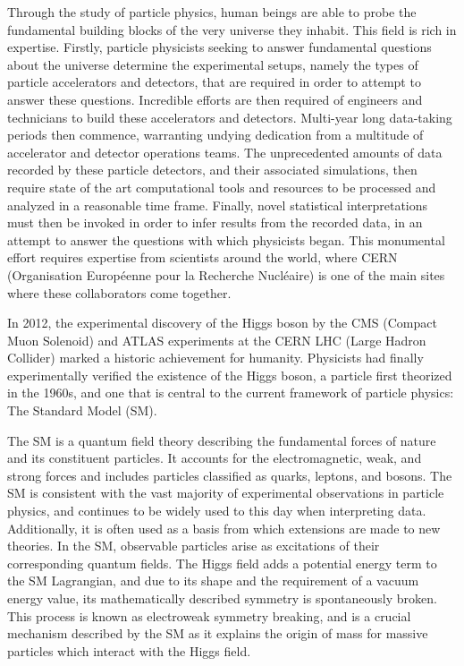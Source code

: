 Through the study of particle physics, human beings are able to probe the fundamental building blocks of the very universe they inhabit. This field is rich in expertise. Firstly, particle physicists seeking to answer fundamental questions about the universe determine the experimental setups, namely the types of particle accelerators and detectors, that are required in order to attempt to answer these questions. Incredible efforts are then required of engineers and technicians to build these accelerators and detectors. Multi-year long data-taking periods then commence, warranting undying dedication from a multitude of accelerator and detector operations teams. The unprecedented amounts of data recorded by these particle detectors, and their associated simulations, then require state of the art computational tools and resources to be processed and analyzed in a reasonable time frame. Finally, novel statistical interpretations must then be invoked in order to infer results from the recorded data, in an attempt to answer the questions with which physicists began. This monumental effort requires expertise from scientists around the world, where CERN (Organisation Europ\'eenne pour la Recherche Nucl\'eaire) is one of the main sites where these collaborators come together. 

In 2012, the experimental discovery of the Higgs boson by the CMS (Compact Muon Solenoid) and ATLAS experiments at the CERN LHC (Large Hadron Collider) \cite{Aad:2012tfa,Chatrchyan:2012ufa,Chatrchyan:2013lba} marked a historic achievement for humanity. Physicists had finally experimentally verified the existence of the Higgs boson, a particle first theorized in the 1960s, and one that is central to the current framework of particle physics: The Standard Model (SM).

The SM is a quantum field theory describing the fundamental forces of nature and its constituent particles. It accounts for the electromagnetic, weak, and strong forces and includes particles classified as quarks, leptons, and bosons. The SM is consistent with the vast majority of experimental observations in particle physics, and continues to be widely used to this day when interpreting data. Additionally, it is often used as a basis from which extensions are made to new theories. In the SM, observable particles arise as excitations of their corresponding quantum fields. The Higgs field adds a potential energy term to the SM Lagrangian, and due to its shape and the requirement of a vacuum energy value, its mathematically described symmetry is spontaneously broken. This process is known as electroweak symmetry breaking, and is a crucial mechanism described by the SM as it explains the origin of mass for massive particles which interact with the Higgs field.

